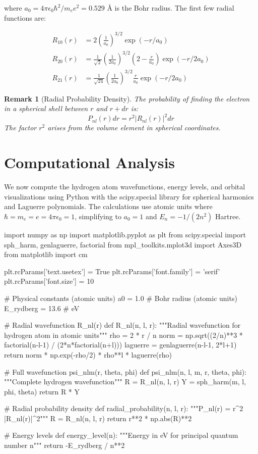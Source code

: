 \documentclass[11pt,a4paper]{article}
\newtheorem{remark}{Remark}[section]
\begin{document}
where $a_0 = 4\pi\epsilon_0\hbar^2/m_e e^2 = 0.529$ Å is the Bohr radius. The first few radial functions are:

\begin{align}
R_{10}(r) &= 2\left(\frac{1}{a_0}\right)^{3/2}\exp(-r/a_0) \\
R_{20}(r) &= \frac{1}{\sqrt{2}}\left(\frac{1}{2a_0}\right)^{3/2}\left(2 - \frac{r}{a_0}\right)\exp(-r/2a_0) \\
R_{21}(r) &= \frac{1}{\sqrt{24}}\left(\frac{1}{2a_0}\right)^{3/2}\frac{r}{a_0}\exp(-r/2a_0)
\end{align}

\begin{remark}[Radial Probability Density]
The probability of finding the electron in a spherical shell between $r$ and $r+dr$ is:
\begin{equation}
P_{nl}(r)dr = r^2|R_{nl}(r)|^2 dr
\end{equation}
The factor $r^2$ arises from the volume element in spherical coordinates.
\end{remark}

\section{Computational Analysis}

We now compute the hydrogen atom wavefunctions, energy levels, and orbital visualizations using Python with the scipy.special library for spherical harmonics and Laguerre polynomials. The calculations use atomic units where $\hbar = m_e = e = 4\pi\epsilon_0 = 1$, simplifying to $a_0 = 1$ and $E_n = -1/(2n^2)$ Hartree.

\begin{pycode}
import numpy as np
import matplotlib.pyplot as plt
from scipy.special import sph_harm, genlaguerre, factorial
from mpl_toolkits.mplot3d import Axes3D
from matplotlib import cm

plt.rcParams['text.usetex'] = True
plt.rcParams['font.family'] = 'serif'
plt.rcParams['font.size'] = 10

# Physical constants (atomic units)
a0 = 1.0  # Bohr radius (atomic units)
E_rydberg = 13.6  # eV

# Radial wavefunction R_nl(r)
def R_nl(n, l, r):
    """Radial wavefunction for hydrogen atom in atomic units"""
    rho = 2 * r / n
    norm = np.sqrt((2/n)**3 * factorial(n-l-1) / (2*n*factorial(n+l)))
    laguerre = genlaguerre(n-l-1, 2*l+1)
    return norm * np.exp(-rho/2) * rho**l * laguerre(rho)

# Full wavefunction psi_nlm(r, theta, phi)
def psi_nlm(n, l, m, r, theta, phi):
    """Complete hydrogen wavefunction"""
    R = R_nl(n, l, r)
    Y = sph_harm(m, l, phi, theta)
    return R * Y

# Radial probability density
def radial_probability(n, l, r):
    """P_nl(r) = r^2 |R_nl(r)|^2"""
    R = R_nl(n, l, r)
    return r**2 * np.abs(R)**2

# Energy levels
def energy_level(n):
    """Energy in eV for principal quantum number n"""
    return -E_rydberg / n**2
\end{pycode}
\end{document}
